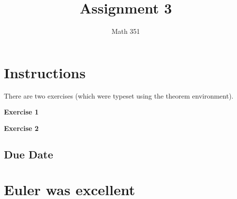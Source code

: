 \documentclass{article}
\title{Assignment 3}
\author{Math 351}
\date{}
\begin{document}
\maketitle

\tableofcontents
\section{Instructions}
There are two exercises (which were typeset using the theorem environment).

\textbf{Exercise 1}

\textbf{Exercise 2}
\subsection{Due Date}
\section{Euler was excellent}
\end{document}
